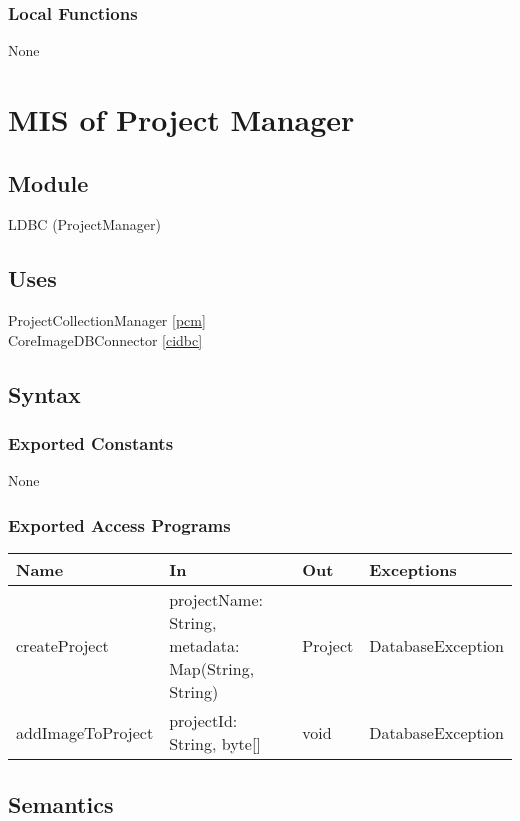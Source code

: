 \documentclass[12pt, titlepage]{article}
\begin{document}
\subsubsection{Local Functions}
None





\section{MIS of Project Manager} \label{pm} 
    \subsection{Module}
        LDBC (ProjectManager)

    \subsection{Uses}
        ProjectCollectionManager \ref{pcm}\\
        CoreImageDBConnector \ref{cidbc}

    \subsection{Syntax}
    \subsubsection{Exported Constants}
        None

    \subsubsection{Exported Access Programs}
    \begin{center}\begin{tabular}{p{3cm} p{4cm} p{3cm} p{3cm}}
    \hline\textbf{Name} & \textbf{In} & \textbf{Out} & \textbf{Exceptions} \\
    \hline
        createProject & projectName: String, metadata: Map(String, String) & Project & DatabaseException \\
        addImageToProject & projectId: String, byte[] & void & DatabaseException \\
    \hline
    \end{tabular}\end{center}

    \subsection{Semantics}
\end{document}

